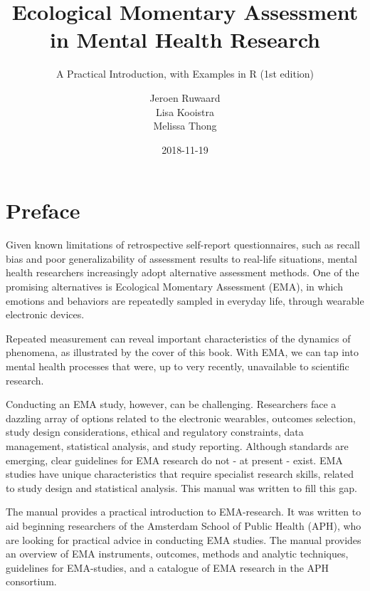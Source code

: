 \documentclass[]{book}
\title{Ecological Momentary Assessment in Mental Health Research}
\subtitle{A Practical Introduction, with Examples in R (1st edition)}
\author{Jeroen Ruwaard \\ Lisa Kooistra \\ Melissa Thong}
\date{2018-11-19}
\let\oldmaketitle\maketitle
\begin{document}
\maketitle

\thispagestyle{empty}


\let\maketitle\oldmaketitle
\maketitle

{
\setcounter{tocdepth}{1}
\tableofcontents
}
\chapter*{Preface}\label{preface}

Given known limitations of retrospective self-report questionnaires,
such as recall bias and poor generalizability of assessment results to
real-life situations, mental health researchers increasingly adopt
alternative assessment methods. One of the promising alternatives is
Ecological Momentary Assessment (EMA), in which emotions and behaviors
are repeatedly sampled in everyday life, through wearable electronic
devices.

Repeated measurement can reveal important characteristics of the
dynamics of phenomena, as illustrated by the cover of this book. With
EMA, we can tap into mental health processes that were, up to very
recently, unavailable to scientific research.

Conducting an EMA study, however, can be challenging. Researchers face a
dazzling array of options related to the electronic wearables, outcomes
selection, study design considerations, ethical and regulatory
constraints, data management, statistical analysis, and study reporting.
Although standards are emerging, clear guidelines for EMA research do
not - at present - exist. EMA studies have unique characteristics that
require specialist research skills, related to study design and
statistical analysis. This manual was written to fill this gap.

The manual provides a practical introduction to EMA-research. It was
written to aid beginning researchers of the Amsterdam School of Public
Health (APH), who are looking for practical advice in conducting EMA
studies. The manual provides an overview of EMA instruments, outcomes,
methods and analytic techniques, guidelines for EMA-studies, and a
catalogue of EMA research in the APH consortium.
\end{document}
